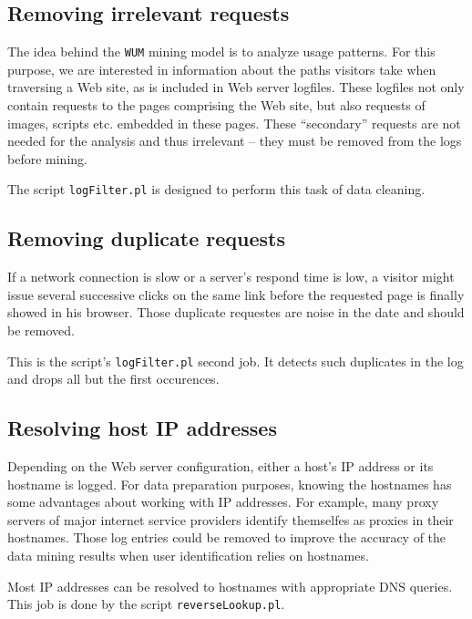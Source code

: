 \documentclass[a4paper]{article}
\begin{document}
\subsection{Removing irrelevant requests}
\label{sec:removeIrrelevantRequests}

The idea behind the \texttt{WUM} mining model is to analyze usage patterns.
For this purpose, we are interested in information about the paths visitors
take when traversing a Web site, as is included in Web server logfiles.
These logfiles not only contain requests to the pages comprising the Web
site, but also requests of images, scripts etc. embedded in these pages.
These ``secondary'' requests are not needed for the analysis and thus
irrelevant -- they must be removed from the logs before mining.

The script \texttt{logFilter.pl} is designed to perform this task of data
cleaning.


\subsection{Removing duplicate requests}
\label{sec:removeDuplicateRequests}

If a network connection is slow or a server's respond time is low, a
visitor might issue several successive clicks on the same link before the
requested page is finally showed in his browser. Those duplicate requestes
are noise in the date and should be removed.

This is the script's \texttt{logFilter.pl} second job. It detects such
duplicates in the log and drops all but the first occurences.


\subsection{Resolving host IP addresses}
\label{sec:resolvIpAddresses}

Depending on the Web server configuration, either a host's IP address or
its hostname is logged. For data preparation purposes, knowing the
hostnames has some advantages about working with IP addresses. For example,
many proxy servers of major internet service providers identify themselfes
as proxies in their hostnames. Those log entries could be removed to
improve the accuracy of the data mining results when user identification
relies on hostnames.

Most IP addresses can be resolved to hostnames with appropriate DNS
queries. This job is done by the script \texttt{reverseLookup.pl}.
\end{document}
